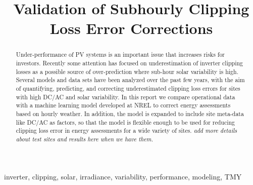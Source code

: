 \documentclass[conference]{IEEEtran}
\begin{document}
\title{Validation of Subhourly Clipping Loss Error Corrections}

\author{
    }

\maketitle

\begin{abstract}
Under-performance of PV systems is an important issue that increases risks for investors. Recently some attention has focused on underestimation of inverter clipping losses as a possible source of over-prediction where sub-hour solar variability is high. Several models and data sets have been analyzed over the past few years, with the aim of quantifying, predicting, and correcting underestimated clipping loss errors for sites with high DC/AC and solar variability. In this report we compare operational data with a machine learning model developed at NREL to correct energy assessments based on hourly weather. In addition, the model is expanded to include site meta-data like DC/AC as factors, so that the model is flexible enough to be used for reducing clipping loss error in energy assessments for a wide variety of sites. \textit{\color{red}add more details about test sites and results here when we have them.}
\end{abstract}

\begin{IEEEkeywords}
inverter, clipping, solar, irradiance, variability, performance, modeling, TMY
\end{IEEEkeywords}
\end{document}
